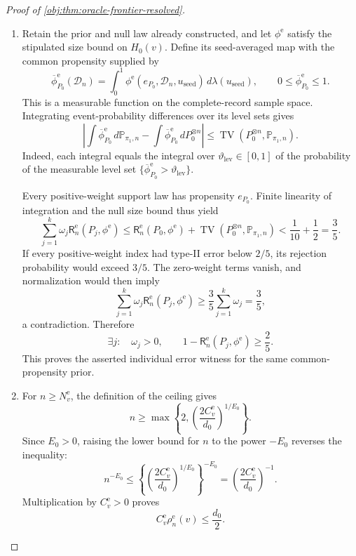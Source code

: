 \documentclass[11pt]{article}
\begin{document}
\begin{proof}[Proof of \cref{obj:thm:oracle-frontier-resolved}]
\begin{enumerate}
\item Retain the prior and null law already constructed, and let \(\phi^{\mathrm e}\) satisfy the stipulated size bound on \(H_0(v)\). Define its seed-averaged map with the common propensity supplied by
\[
\overline\phi^{\mathrm e}_{P_0}(\mathcal D_n)
=\int_0^1\phi^{\mathrm e}(e_{P_0},\mathcal D_n,u_{\mathrm{seed}})\,d\lambda(u_{\mathrm{seed}}),
\qquad
0\le\overline\phi^{\mathrm e}_{P_0}\le1.
\]
This is a measurable function on the complete-record sample space. Integrating event-probability differences over its level sets gives
\[
\left|
\int\overline\phi^{\mathrm e}_{P_0}\,d\mathbb P_{\pi_1,n}
-\int\overline\phi^{\mathrm e}_{P_0}\,dP_0^{\otimes n}
\right|
\le\operatorname{TV}\!\left(P_0^{\otimes n},\mathbb P_{\pi_1,n}\right).
\]
Indeed, each integral equals the integral over \(\vartheta_{\mathrm{lev}}\in[0,1]\) of the probability of the measurable level set
\(\{\overline\phi^{\mathrm e}_{P_0}>\vartheta_{\mathrm{lev}}\}\).

Every positive-weight support law has propensity \(e_{P_0}\). Finite linearity of integration and the null size bound thus yield
\[
\sum_{j=1}^{k}\omega_j
\mathsf R_n^{\mathrm e}(P_j,\phi^{\mathrm e})
\le
\mathsf R_n^{\mathrm e}(P_0,\phi^{\mathrm e})
+\operatorname{TV}\!\left(P_0^{\otimes n},\mathbb P_{\pi_1,n}\right)
<\frac1{10}+\frac12=\frac35.
\]
If every positive-weight index had type-II error below \(2/5\), its rejection probability would exceed \(3/5\). The zero-weight terms vanish, and normalization would then imply
\[
\sum_{j=1}^{k}\omega_j
\mathsf R_n^{\mathrm e}(P_j,\phi^{\mathrm e})
\ge\frac35\sum_{j=1}^{k}\omega_j=\frac35,
\]
a contradiction. Therefore
\[
\exists j:\quad
\omega_j>0,\qquad
1-\mathsf R_n^{\mathrm e}(P_j,\phi^{\mathrm e})\ge\frac25.
\]
This proves the asserted individual error witness for the same common-propensity prior.

\item For \(n\ge N^{\mathrm e}_v\), the definition of the ceiling gives
\[
n\ge
\max\left\{2,\left(\frac{2C^{\mathrm e}_v}{d_0}\right)^{1/E_0}\right\}.
\]
Since \(E_0>0\), raising the lower bound for \(n\) to the power \(-E_0\) reverses the inequality:
\[
n^{-E_0}
\le
\left\{
\left(\frac{2C^{\mathrm e}_v}{d_0}\right)^{1/E_0}
\right\}^{-E_0}
=\left(\frac{2C^{\mathrm e}_v}{d_0}\right)^{-1}.
\]
Multiplication by \(C^{\mathrm e}_v>0\) proves
\[
C^{\mathrm e}_v\rho_n^{\mathrm e}(v)\le\frac{d_0}{2}.
\]


\end{enumerate}
\end{proof}
\end{document}
